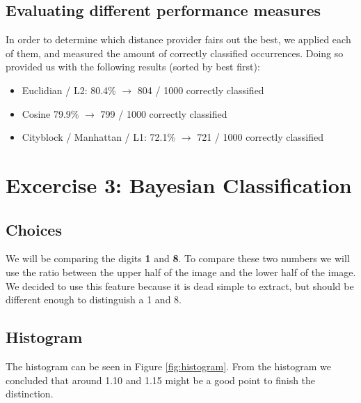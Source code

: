 \documentclass{article}
\begin{document}
\subsection{Evaluating different performance measures}
In order to determine which distance provider fairs out the best, we applied each of them, and measured the amount of correctly classified occurrences.\newline
Doing so provided us with the following results (sorted by best first):
\begin{itemize}
\item Euclidian / L2: 80.4\% $\rightarrow$ 804 / 1000 correctly classified
\item Cosine 79.9\% $\rightarrow$ 799 / 1000 correctly classified
\item Cityblock / Manhattan / L1: 72.1\% $\rightarrow$ 721 / 1000 correctly classified
\end{itemize}

\section{Excercise 3: Bayesian Classification}
\subsection{Choices}
We will be comparing the digits \textbf{1} and \textbf{8}.
To compare these two numbers we will use the ratio between the upper half of the image and the lower half of the image. We decided to use this feature because it is dead simple to extract, but should be different enough to distinguish a 1 and 8.


\subsection{Histogram}
The histogram can be seen in Figure \ref{fig:histogram}.
From the histogram we concluded that around 1.10 and 1.15 might be a good point to finish the distinction.
\end{document}

